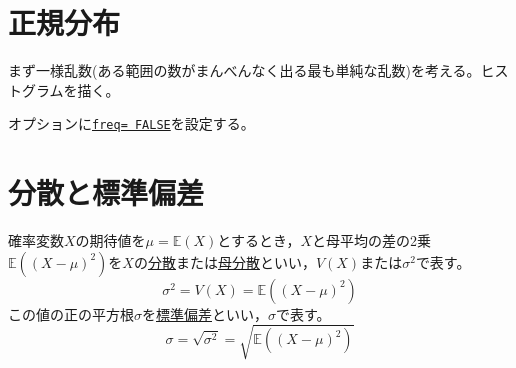 \section{正規分布}
まず一様乱数(ある範囲の数がまんべんなく出る最も単純な乱数)を考える。ヒストグラムを描く。
    オプションに\underline{\texttt{freq= FALSE}}を設定する。

\section{分散と標準偏差}
    確率変数$X$の期待値を$\mu= \mathbb{E}(X)$とするとき，$X$と母平均の差の2乗$\mathbb{E}((X- \mu)^2)$を$X$の\underline{分散}または\underline{母分散}といい，$V(X)$または$\sigma^2$で表す。
\begin{equation*}
    \sigma^2= V(X)= \mathbb{E}((X- \mu)^2)
\end{equation*}
    この値の正の平方根$\sigma$を\underline{標準偏差}といい，$\sigma$で表す。
\begin{equation*}
    \sigma= \sqrt{\sigma^2}= \sqrt{\mathbb{E}((X- \mu)^2)}
\end{equation*}